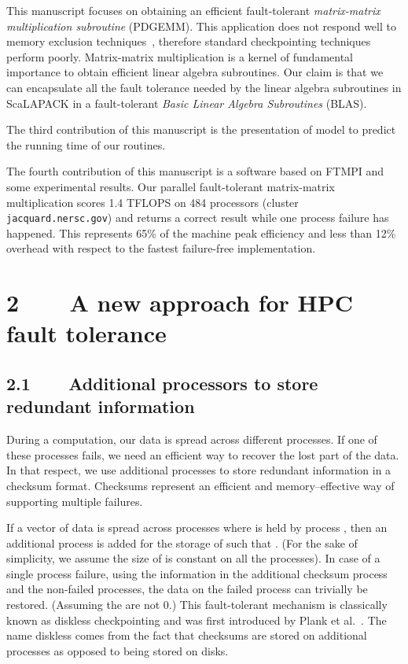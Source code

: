 \documentclass[pdftex,11pt]{article}
\begin{document}
This manuscript focuses on obtaining an efficient fault-tolerant
\textit{matrix-matrix multiplication subroutine} (PDGEMM).  This
application does not respond well to memory exclusion
techniques~\cite{KiPD:97}, therefore standard checkpointing techniques
perform poorly.  Matrix-matrix multiplication is a kernel of
fundamental importance to obtain efficient linear algebra subroutines.
Our claim is that we can encapsulate all the fault tolerance needed by
the linear algebra subroutines in ScaLAPACK in a fault-tolerant
\textit{Basic Linear Algebra Subroutines} (BLAS).

The third contribution of this manuscript is the presentation of model
to predict the running time of our routines.

The fourth contribution of this manuscript is a software based on
FTMPI and some experimental results.  Our parallel fault-tolerant
matrix-matrix multiplication scores 1.4 TFLOPS on 484 processors
(cluster \texttt{jacquard.nersc.gov}) and returns a correct result
while one process failure has happened. This represents 65\% of the
machine peak efficiency and less than 12\% overhead with respect to
the fastest failure-free implementation.

\section*{\color{DodgerBlue4}2~~~~A new approach for HPC fault
  tolerance}

\subsection*{\color{DodgerBlue4}2.1~~~~Additional processors to
  store redundant information}

During a computation, our data is spread across different
processes. If one of these processes fails, we need an efficient way
to recover the lost part of the data. In that respect, we use
additional processes to store redundant information in a checksum
format.  Checksums represent an efficient and memory--effective way of
supporting multiple failures.

If a vector of data  is spread across  processes where  is
held by process , then an additional process is added for the
storage of  such that .  (For
the sake of simplicity, we assume the size of  is constant on all
the processes). In case of a single process failure, using the
information in the additional checksum process and the non-failed
processes, the data on the failed process can trivially be restored.
(Assuming the  are not 0.)  This fault-tolerant mechanism is
classically known as diskless checkpointing and was first introduced
by Plank et al.~\cite{PlKD:95}. The name diskless comes from the fact
that checksums are stored on additional processes as opposed to being
stored on disks.
\end{document}

